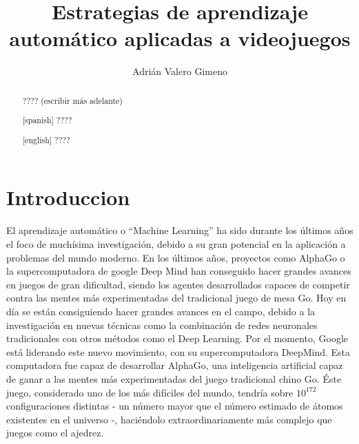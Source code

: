 \documentclass[11pt,spanish,listoffigures,listoftables]{tfgetsinf}
\title{Estrategias de aprendizaje automático aplicadas a videojuegos}
\author{Adrián Valero Gimeno}
\begin{document}

\begin{abstract}
???? (escribir más adelante)
\end{abstract}
\begin{abstract}[spanish]
????
\end{abstract}
\begin{abstract}[english]
????
\end{abstract}


\mainmatter


\chapter{Introduccion}

El aprendizaje automático o “Machine Learning” ha sido durante los últimos años el foco de muchísima investigación, debido a su gran potencial en la aplicación a problemas del mundo moderno. En los últimos años, proyectos como AlphaGo o la supercomputadora de google Deep Mind han conseguido hacer grandes avances en juegos de gran dificultad, siendo los agentes desarrollados capaces de competir contra las mentes más experimentadas del tradicional juego de mesa Go. 
Hoy en día se están consiguiendo hacer grandes avances en el campo, debido a la investigación en nuevas técnicas como la combinación de redes neuronales tradicionales con otros métodos como el Deep Learning. Por el momento, Google está liderando este nuevo movimiento, con su supercomputadora DeepMind. Esta computadora fue capaz de desarrollar AlphaGo, una inteligencia artificial capaz de ganar a las mentes más experimentadas del juego tradicional chino Go. Éste juego, considerado uno de los más difíciles del mundo, tendría sobre $10^{172}$ configuraciones distintas - un número mayor que el número estimado de átomos existentes en el universo -, haciéndolo extraordinariamente más complejo que juegos como el ajedrez.
\end{document}

